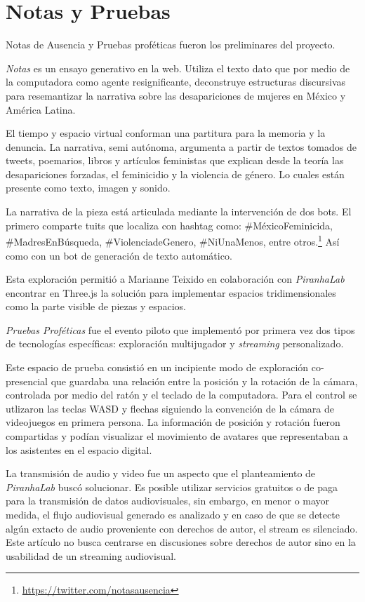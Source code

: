
\section*{Notas y Pruebas} %

Notas de Ausencia y Pruebas proféticas fueron los preliminares del proyecto. 


\textit{Notas} es un ensayo generativo en la web. Utiliza el texto dato que por medio de la computadora como agente resignificante, deconstruye estructuras discursivas para resemantizar la narrativa sobre las desapariciones de mujeres en México y América Latina.

El tiempo y espacio virtual conforman una partitura para la memoria y la denuncia. La narrativa, semi autónoma, argumenta a partir de textos tomados de tweets, poemarios, libros y artículos feministas que explican desde la teoría las desapariciones forzadas, el feminicidio y la violencia de género. Lo cuales están presente como texto, imagen y sonido.

La narrativa de la pieza está articulada mediante la intervención de dos bots. El primero comparte tuits que localiza con hashtag como: \#MéxicoFeminicida, \#MadresEnBúsqueda, \#ViolenciadeGenero, \#NiUnaMenos, entre otros.\footnote{\url{https://twitter.com/notasausencia}} Así como con un bot de generación de texto automático.

Esta exploración permitió a Marianne Teixido en colaboración con \textit{PiranhaLab} encontrar en Three.js la solución para implementar espacios tridimensionales como la parte visible de piezas y espacios.  

\textit{Pruebas Proféticas} fue el evento piloto que implementó por primera vez dos tipos de tecnologías específicas: exploración multijugador y \textit{streaming} personalizado.

Este espacio de prueba consistió en un incipiente modo de exploración co-presencial que guardaba una relación entre la posición y la rotación de la cámara, controlada por medio del ratón y el teclado de la computadora. Para el control se utlizaron las teclas WASD y flechas siguiendo la convención de la cámara de videojuegos en primera persona. La información de posición y rotación fueron compartidas y podían visualizar el movimiento de avatares que representaban a los asistentes en el espacio digital. 

La transmisión de audio y video fue un aspecto que el planteamiento de \textit{PiranhaLab} buscó solucionar. Es posible utilizar servicios gratuitos o de paga para la transmisión de datos audiovisuales, sin embargo, en menor o mayor medida, el flujo audiovisual generado es analizado y en caso de que se detecte algún extacto de audio proveniente con derechos de autor, el stream es silenciado. Este artículo no busca centrarse en discusiones sobre derechos de autor sino en la usabilidad de un streaming audiovisual. 

